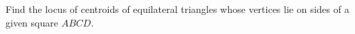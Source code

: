 Find the locus of centroids of equilateral triangles whose vertices lie on sides of a given square $ABCD$.